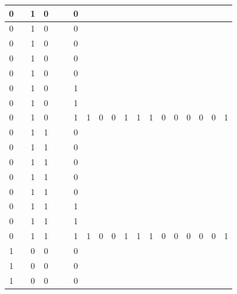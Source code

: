 \begin{table}[!tb]
\begin{tabular}{|c|c|c|c|c|c|c|c|c|c|c|c|c|c|c|c|c|c|c|}
        \rowcolor{red!40} 0 &  & 1 & 0 &  &  & 0 &  &  &  &  &  &  &  &  &  &  &  &  \\ \hline
        \rowcolor{red!40} 0 &  & 1 & 0 &  &  & 0 &  &  &  &  &  &  &  &  &  &  &  &  \\ \hline
        \rowcolor{red!40} 0 &  & 1 & 0 &  &  & 0 &  &  &  &  &  &  &  &  &  &  &  &  \\ \hline
        \rowcolor{red!40} 0 &  & 1 & 0 &  &  & 0 &  &  &  &  &  &  &  &  &  &  &  &  \\ \hline
        \rowcolor{red!40} 0 &  & 1 & 0 &  &  & 0 &  &  &  &  &  &  &  &  &  &  &  &  \\ \hline
        \rowcolor{red!40} 0 &  & 1 & 0 &  &  & 1 &  &  &  &  &  &  &  &  &  &  &  &  \\ \hline
        \rowcolor{red!40} 0 &  & 1 & 0 &  &  & 1 &  &  &  &  &  &  &  &  &  &  &  &  \\ \hline
        \rowcolor{red!40} 0 &  & 1 & 0 &  &  & 1 & 1 & 0 & 0 & 1 & 1 & 1 & 0 & 0 & 0 & 0 & 0 & 1 \\ \hline
        \rowcolor{green!40} 0 &  & 1 & 1 &  &  & 0 &  &  &  &  &  &  &  &  &  &  &  &  \\ \hline
        \rowcolor{green!40} 0 &  & 1 & 1 &  &  & 0 &  &  &  &  &  &  &  &  &  &  &  &  \\ \hline
        \rowcolor{green!40} 0 &  & 1 & 1 &  &  & 0 &  &  &  &  &  &  &  &  &  &  &  &  \\ \hline
        \rowcolor{green!40} 0 &  & 1 & 1 &  &  & 0 &  &  &  &  &  &  &  &  &  &  &  &  \\ \hline
        \rowcolor{green!40} 0 &  & 1 & 1 &  &  & 0 &  &  &  &  &  &  &  &  &  &  &  &  \\ \hline
        \rowcolor{green!40} 0 &  & 1 & 1 &  &  & 1 &  &  &  &  &  &  &  &  &  &  &  &  \\ \hline
        \rowcolor{green!40} 0 &  & 1 & 1 &  &  & 1 &  &  &  &  &  &  &  &  &  &  &  &  \\ \hline
        \rowcolor{green!40} 0 &  & 1 & 1 &  &  & 1 & 1 & 0 & 0 & 1 & 1 & 1 & 0 & 0 & 0 & 0 & 0 & 1 \\ \hline
        \rowcolor{yellow!40} 1 &  & 0 & 0 &  &  & 0 &  &  &  &  &  &  &  &  &  &  &  &  \\ \hline
        \rowcolor{yellow!40} 1 &  & 0 & 0 &  &  & 0 &  &  &  &  &  &  &  &  &  &  &  &  \\ \hline
        \rowcolor{yellow!40} 1 &  & 0 & 0 &  &  & 0 &  &  &  &  &  &  &  &  &  &  &  &  \\ \hline

\end{tabular}
\end{table}
